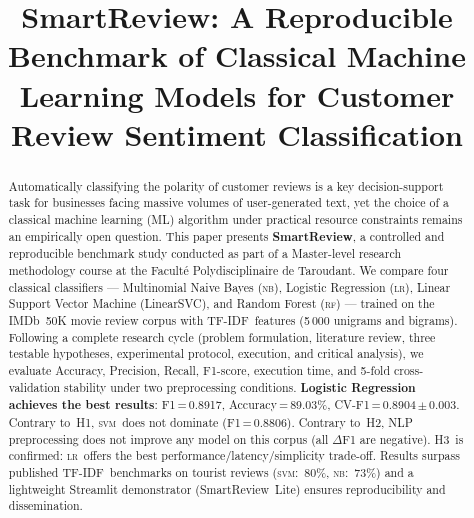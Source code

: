 \documentclass[conference]{IEEEtran}
\newcommand{\LR}{\textsc{lr}}
\newcommand{\SVM}{\textsc{svm}}
\newcommand{\NB}{\textsc{nb}}
\newcommand{\RF}{\textsc{rf}}
\newcommand{\TFIDF}{TF-IDF}
\begin{document}
\title{SmartReview: A Reproducible Benchmark of Classical Machine Learning Models for Customer Review Sentiment Classification}

\author{
  \and
}

\maketitle

\begin{abstract}
Automatically classifying the polarity of customer reviews is a
key decision-support task for businesses facing massive volumes of
user-generated text, yet the choice of a classical machine learning
(ML) algorithm under practical resource constraints remains an
empirically open question.
This paper presents \textbf{SmartReview}, a controlled and
reproducible benchmark study conducted as part of a Master-level
research methodology course at the Facult\'e Polydisciplinaire de
Taroudant.
We compare four classical classifiers --- Multinomial Naive Bayes
(\NB), Logistic Regression (\LR), Linear Support Vector Machine
(LinearSVC), and Random Forest (\RF) --- trained on the IMDb~50K
movie review corpus with \TFIDF\ features (5\,000 unigrams and
bigrams).
Following a complete research cycle (problem formulation,
literature review, three testable hypotheses, experimental
protocol, execution, and critical analysis), we evaluate Accuracy,
Precision, Recall, F1-score, execution time, and 5-fold
cross-validation stability under two preprocessing conditions.
\textbf{Logistic Regression achieves the best results}:
F1\,=\,0.8917, Accuracy\,=\,89.03\%, CV-F1\,=\,0.8904\,$\pm$\,0.003.
Contrary to~H1, \SVM\ does not dominate (F1\,=\,0.8806).
Contrary to~H2, NLP preprocessing does not improve any model on
this corpus (all $\Delta$F1 are negative).
H3~is confirmed: \LR\ offers the best performance/latency/simplicity
trade-off.
Results surpass published \TFIDF\ benchmarks on tourist reviews
(\SVM:~80\%, \NB:~73\%) and a lightweight Streamlit demonstrator
(SmartReview~Lite) ensures reproducibility and dissemination.
\end{abstract}
\end{document}
